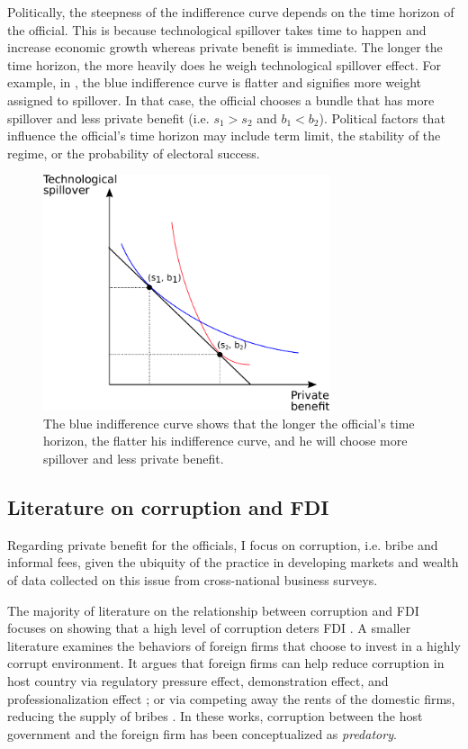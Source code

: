 Politically, the steepness of the indifference curve depends on the time horizon of the official. This is because technological spillover takes time to happen and increase economic growth whereas private benefit is immediate. The longer the time horizon, the more heavily does he weigh technological spillover effect. For example, in , the blue indifference curve is flatter and signifies more weight assigned to spillover. In that case, the official chooses a bundle that has more spillover and less private benefit (i.e. $s_1 > s_2$ and $b_1 < b_2$). Political factors that influence the official's time horizon may include term limit, the stability of the regime, or the probability of electoral success. 

\begin{figure}[!ht]
	\centering
    \includegraphics[width=0.75\textwidth, height=0.75\textheight,keepaspectratio]{../figure/indifference_curve}
    \caption{The blue indifference curve shows that the longer the official's time horizon, the flatter his indifference curve, and he will choose more spillover and less private benefit.}
    \label{fig:indifference_curve}
\end{figure}

\subsection{Literature on corruption and FDI}

Regarding private benefit for the officials, I focus on corruption, i.e. bribe and informal fees, given the ubiquity of the practice in developing markets and wealth of data collected on this issue from cross-national business surveys. 

The majority of literature on the relationship between corruption and FDI focuses on showing that a high level of corruption deters FDI \citep{Wei2000, Hakkala2008, Al-Sadig2009}. A smaller literature examines the behaviors of foreign firms that choose to invest in a highly corrupt environment. It argues that foreign firms can help reduce corruption in host country via regulatory pressure effect, demonstration effect, and professionalization effect \citep{Kwok2006}; or via competing away the rents of the domestic firms, reducing the supply of bribes \citep{Sandholtz2003}. In these works, corruption between the host government and the foreign firm has been conceptualized as \textit{predatory}.

